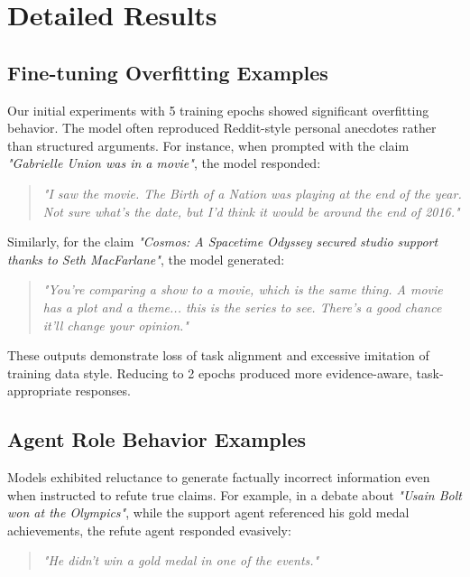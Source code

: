 \documentclass[11pt]{article}
\begin{document}
\appendix

\section{Detailed Results}
\label{app:detailed_results}

\subsection{Fine-tuning Overfitting Examples}

Our initial experiments with 5 training epochs showed significant overfitting behavior. The model often reproduced Reddit-style personal anecdotes rather than structured arguments. For instance, when prompted with the claim \textit{"Gabrielle Union was in a movie"}, the model responded:

\begin{quote}
\small
\textit{"I saw the movie. The Birth of a Nation was playing at the end of the year. Not sure what's the date, but I'd think it would be around the end of 2016."}
\end{quote}

Similarly, for the claim \textit{"Cosmos: A Spacetime Odyssey secured studio support thanks to Seth MacFarlane"}, the model generated:

\begin{quote}
\small
\textit{"You're comparing a show to a movie, which is the same thing. A movie has a plot and a theme... this is the series to see. There's a good chance it'll change your opinion."}
\end{quote}

These outputs demonstrate loss of task alignment and excessive imitation of training data style. Reducing to 2 epochs produced more evidence-aware, task-appropriate responses.

\subsection{Agent Role Behavior Examples}

Models exhibited reluctance to generate factually incorrect information even when instructed to refute true claims. For example, in a debate about \textit{"Usain Bolt won at the Olympics"}, while the support agent referenced his gold medal achievements, the refute agent responded evasively:

\begin{quote}
\small
\textit{"He didn't win a gold medal in one of the events."}
\end{quote}
\end{document}
